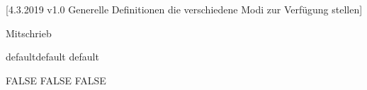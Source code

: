 [4.3.2019 v1.0 Generelle Definitionen die verschiedene Modi zur Verfügung stellen]



\providecommand{\LILLYxMODE}{default}
\providecommand\LILLYxMODExDEFAULT{default}
\providecommand\LILLYxMODExDUMMY{dummy}

\providecommand{\LILLYxBOXxMODE}{DEFAULT}
\providecommand{\LILLYxFOOTERxBUTTONS}{TRUE}

\def\LILLY@Typ@Mitschrieb{Mitschrieb}
\def\LILLY@Typ@Uebungsblatt{Uebungsblatt}
\def\LILLY@Typ@Dokumentation{Dokumentation}
\def\LILLY@Typ@Zusammenfassung{Zusammenfassung}

\RequirePackage{imakeidx} %

\ifx\LILLY@Typ\LILLY@Typ@Mitschrieb
    \providecommand{\LILLYxBOXxAufgabexBox}{FALSE}
\fi


\ifx\LILLYxMODE\LILLYxMODExDEFAULT
    \providecommand\LILLYxBOXxBeispielxBox{FALSE}
\else\ifx\LILLYxMODE\LILLYxMODExPRINT
    \renewcommand{\LILLYxFOOTERxBUTTONS}{FALSE}
    \providecommand{\LILLYxHYPERLINK}{FALSE}
    \providecommand\LILLYxBOXxBemerkungxBox{FALSE}
    \providecommand\LILLYxBOXxBeweisxBox{FALSE}
    \providecommand\LILLYxBOXxBeispielxBox{FALSE}
    \providecommand\LILLYxBOXxLemmaxBox{FALSE}
    \raggedbottom  %
\fi\fi


\ifx\LILLYxMODExEXTRA\true %
\else
\fi


\ifx\LILLYxBOXxBeispielxBox\false\renewcommand{\LILLYxColorxBeispiel}{\LILLYxColorxLINKSxMainColor}\fi
\ifx\LILLYxBOXxBeweisxBox\false\renewcommand{\LILLYxColorxBeweis}{\LILLYxColorxLINKSxMainColor}\fi
\ifx\LILLYxBOXxBemerkungxBox\false\renewcommand{\LILLYxColorxBemerkung}{\LILLYxColorxLINKSxMainColor}\fi





